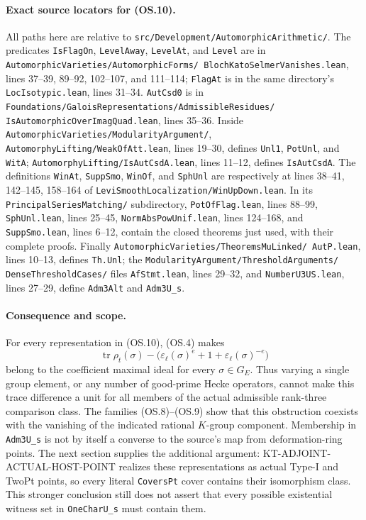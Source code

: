 \paragraph{Exact source locators for (OS.10).}
All paths here are relative to
\texttt{src/Development/AutomorphicArithmetic/}.
The predicates \texttt{IsFlagOn}, \texttt{LevelAway},
\texttt{LevelAt}, and \texttt{Level} are in
\texttt{AutomorphicVarieties/AutomorphicForms/%
BlochKatoSelmerVanishes.lean}, lines 37--39,
89--92, 102--107, and 111--114;
\texttt{FlagAt} is in the same directory's
\texttt{LocIsotypic.lean}, lines 31--34.
\texttt{AutCsd0} is in
\texttt{Foundations/GaloisRepresentations/AdmissibleResidues/%
IsAutomorphicOverImagQuad.lean}, lines 35--36.
Inside \texttt{AutomorphicVarieties/ModularityArgument/},
\texttt{AutomorphyLifting/WeakOfAtt.lean}, lines 19--30,
defines \texttt{Unl1}, \texttt{PotUnl}, and \texttt{WitA};
\texttt{AutomorphyLifting/IsAutCsdA.lean}, lines 11--12,
defines \texttt{IsAutCsdA}.
The definitions \texttt{WinAt}, \texttt{SuppSmo},
\texttt{WinOf}, and \texttt{SphUnl} are respectively at
lines 38--41, 142--145, 158--164 of
\texttt{LeviSmoothLocalization/WinUpDown.lean}.
In its \texttt{PrincipalSeriesMatching/} subdirectory,
\texttt{PotOfFlag.lean}, lines 88--99,
\texttt{SphUnl.lean}, lines 25--45,
\texttt{NormAbsPowUnif.lean}, lines 124--168, and
\texttt{SuppSmo.lean}, lines 6--12, contain the closed
theorems just used, with their complete proofs.
Finally \texttt{AutomorphicVarieties/TheoremsMuLinked/%
AutP.lean}, lines 10--13,
defines \texttt{Th.Unl}; the
\texttt{ModularityArgument/ThresholdArguments/%
DenseThresholdCases/} files \texttt{AfStmt.lean},
lines 29--32, and \texttt{NumberU3US.lean}, lines 27--29,
define \texttt{Adm3Alt} and \texttt{Adm3U\_s}.

\paragraph{Consequence and scope.}
For every representation in (OS.10), (OS.4) makes
\[
 \operatorname{tr}\rho_t(\sigma)
  -\bigl(\varepsilon_\ell(\sigma)^e+1+
                         \varepsilon_\ell(\sigma)^{-e}\bigr)
\]
belong to the coefficient maximal ideal for every
$\sigma\in G_E$. Thus varying a single group element,
or any number of good-prime Hecke operators, cannot make
this trace difference a unit for all members of the
actual admissible rank-three comparison class.
The families (OS.8)--(OS.9) show that this obstruction
coexists with the vanishing of the indicated rational
$K$-group component.
Membership in \texttt{Adm3U\_s} is not by itself a converse
to the source's map from deformation-ring points.
The next section supplies the additional argument:
KT-ADJOINT-ACTUAL-HOST-POINT realizes these representations
as actual Type-I and TwoPt points, so every literal
\texttt{CoversPt} cover contains their isomorphism class.
This stronger conclusion still does not assert that every
possible existential witness set in \texttt{OneCharU\_s}
must contain them.

